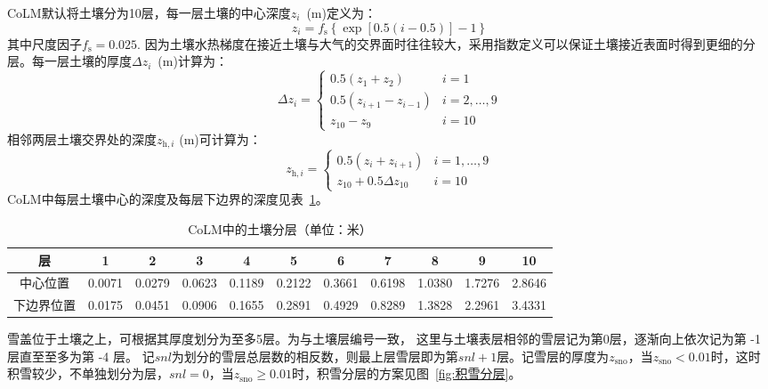 CoLM默认将土壤分为10层，每一层土壤的中心深度$z_i$~(m)定义为：
\begin{equation}
  z_{i} = f_{\mathrm{s}}\left\{ \exp{\left\lbrack 0.5(i - 0.5) \right\rbrack} - 1 \right\}
\end{equation}
其中尺度因子$f_{\mathrm {s}}=0.025$. 因为土壤水热梯度在接近土壤与大气的交界面时往往较大，采用指数定义可以保证土壤接近表面时得到更细的分层。每一层土壤的厚度$\Delta z_i$~(m)计算为：
\begin{equation}
  \Delta z_{i}=\left\{\begin{array}{ll}0.5\left(z_{1}+z_{2}\right) & i=1 \\
      0.5\left(z_{i+1}-z_{i-1}\right) & i=2, \ldots, 9 \\
  z_{10}-z_{9} & i=10\end{array}\right.
\end{equation}
相邻两层土壤交界处的深度$z_{\mathrm{h},i}$ (m)可计算为：
\begin{equation}
  z_{\mathrm{h},i}=\left\{\begin{array}{ll}0.5\left(z_{i}+z_{i+1}\right) & i=1, \ldots, 9 \\
  z_{10}+0.5 \Delta z_{10} & i=10\end{array}\right.
\end{equation}
CoLM中每层土壤中心的深度及每层下边界的深度见表~\ref{table:土壤分层}。

\begin{table}[b]
  \caption{CoLM中的土壤分层（单位：米）} \label{table:土壤分层}
  \centering \renewcommand{\arraystretch}{1.2} \footnotesize
  \begin{tabular}{ccccccccccc}
    \toprule
    层         & 1      & 2      & 3      & 4      & 5      & 6      & 7      & 8      & 9      & 10     \\
    \midrule
    中心位置   & 0.0071 & 0.0279 & 0.0623 & 0.1189 & 0.2122 & 0.3661 & 0.6198 & 1.0380 & 1.7276 & 2.8646 \\
    下边界位置 & 0.0175 & 0.0451 & 0.0906 & 0.1655 & 0.2891 & 0.4929 & 0.8289 & 1.3828 & 2.2961 & 3.4331 \\
    \bottomrule
  \end{tabular}
\end{table}


雪盖位于土壤之上，可根据其厚度划分为至多5层。为与土壤层编号一致，
这里与土壤表层相邻的雪层记为第0层，逐渐向上依次记为第 -1 层直至至多为第 -4 层。
记$snl$为划分的雪层总层数的相反数，则最上层雪层即为第$snl+1$层。记雪层的厚度为$z_{\mathrm{sno}}$，当$z_{\mathrm{sno}}<0.01$时，这时积雪较少，不单独划分为层，$snl=0$，当$z_{\mathrm{sno}}\geqslant 0.01$时，积雪分层的方案见图~\ref{fig:积雪分层}。


